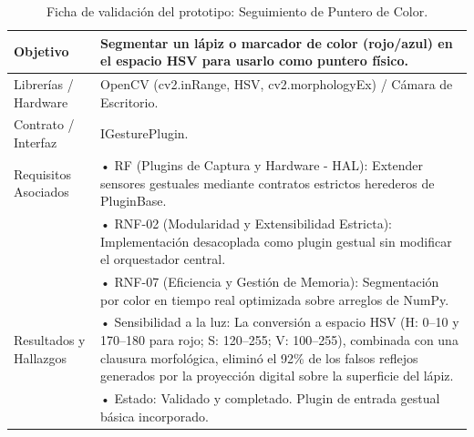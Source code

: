\begin{table}[H]
    \centering
    \caption{Ficha de validación del prototipo: Seguimiento de Puntero de Color.}
    \label{tab:ficha_f5}
    \begin{tabular}{L{3.2cm} L{11.0cm}}
        \toprule
        Objetivo & Segmentar un lápiz o marcador de color (rojo/azul) en el espacio HSV para usarlo como puntero físico. \\ \midrule
        Librerías / Hardware & OpenCV (cv2.inRange, HSV, cv2.morphologyEx) / Cámara de Escritorio. \\ \midrule
        Contrato / Interfaz & IGesturePlugin. \\ \midrule
        Requisitos Asociados &
        • RF (Plugins de Captura y Hardware - HAL): Extender sensores gestuales mediante contratos estrictos herederos de PluginBase. \vspace{0.1cm} \\
        & • RNF-02 (Modularidad y Extensibilidad Estricta): Implementación desacoplada como plugin gestual sin modificar el orquestador central. \vspace{0.1cm} \\
        & • RNF-07 (Eficiencia y Gestión de Memoria): Segmentación por color en tiempo real optimizada sobre arreglos de NumPy. \\ \midrule
        Resultados y Hallazgos &
        • Sensibilidad a la luz: La conversión a espacio HSV (H: 0--10 y 170--180 para rojo; S: 120--255; V: 100--255), combinada con una clausura morfológica, eliminó el 92\% de los falsos reflejos generados por la proyección digital sobre la superficie del lápiz. \vspace{0.1cm} \\
        & • Estado: Validado y completado. Plugin de entrada gestual básica incorporado. \\ \bottomrule
    \end{tabular}
\end{table}
 
